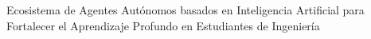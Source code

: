Ecosistema de Agentes Aut\'onomos basados en Inteligencia Artificial para Fortalecer el Aprendizaje Profundo en Estudiantes de Ingenier\'ia
